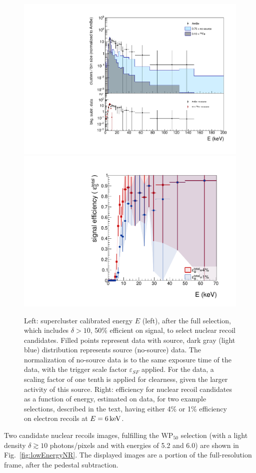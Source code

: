 \begin{figure}[ht]
  \begin{center}
    \includegraphics[width=0.45\linewidth]{figures/energyFull_WP50}
    \includegraphics[width=0.45\linewidth]{figures/energyFull_effi}

    \caption{Left: supercluster calibrated energy $E$ (left), after the
      full selection, which includes $\delta>10$, 50\% efficient on
      signal, to select nuclear recoil candidates. Filled points
      represent data with \ambe source, dark gray (light blue)
      distribution represents   \fe source (no-source) data.  The
      normalization of no-source  data  is to the same exposure
      time of the \ambe data, with the trigger scale factor
      $\varepsilon_{SF}$ applied. For the  \fe data, a scaling
      factor of one tenth is applied for clearness, given the larger
      activity of this source. Right: efficiency for nuclear recoil
      candidates as a function of energy, estimated on \ambe data, for
      two example selections, described in the text, having either 4\%
      or 1\% efficiency on electron recoils at
      $E=6\,\textrm{ke\hspace{-.08em}V}$. \label{fig:fullsel_effi}}

  \end{center}
\end{figure}

Two candidate  nuclear recoils images, fulfilling the 
$\mathrm{WP}_{50}$ selection  (with a light density $\delta\gtrsim10$
photons/pixels and with energies of 5.2 and 6.0\keV)  are shown in
Fig.~\ref{fig:lowEnergyNR}. The displayed images are a portion of the full-resolution frame, after the pedestal subtraction.

